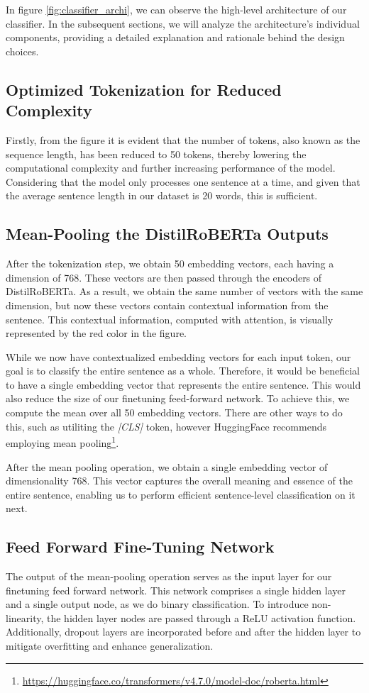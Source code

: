 \documentclass[a4paper,10pt]{report}
\begin{document}
In figure \ref{fig:classifier_archi}, we can observe the high-level architecture of our classifier. In the subsequent sections, we will analyze the architecture's individual components, providing a detailed explanation and rationale behind the design choices.

\subsection{Optimized Tokenization for Reduced Complexity}
Firstly, from the figure it is evident that the number of tokens, also known as the sequence length, has been reduced to 50 tokens, thereby lowering the computational complexity and further increasing performance of the model. Considering that the model only processes one sentence at a time, and given that the average sentence length in our dataset is 20 words, this is sufficient.

\subsection{Mean-Pooling the DistilRoBERTa Outputs}
After the tokenization step, we obtain 50 embedding vectors, each having a dimension of 768. These vectors are then passed through the encoders of DistilRoBERTa. As a result, we obtain the same number of vectors with the same dimension, but now these vectors contain contextual information from the sentence. This contextual information, computed with attention, is visually represented by the red color in the figure.

While we now have contextualized embedding vectors for each input token, our goal is to classify the entire sentence as a whole. Therefore, it would be beneficial to have a single embedding vector that represents the entire sentence. This would also reduce the size of our finetuning feed-forward network. To achieve this, we compute the mean over all 50 embedding vectors. There are other ways to do this, such as utiliting the \textit{[CLS]} token, however HuggingFace recommends employing mean pooling\footnote{\url{https://huggingface.co/transformers/v4.7.0/model-doc/roberta.html}}.

After the mean pooling operation, we obtain a single embedding vector of dimensionality 768. This vector captures the overall meaning and essence of the entire sentence, enabling us to perform efficient sentence-level classification on it next.

\subsection{Feed Forward Fine-Tuning Network}
The output of the mean-pooling operation serves as the input layer for our finetuning feed forward network. This network comprises a single hidden layer and a single output node, as we do binary classification. To introduce non-linearity, the hidden layer nodes are passed through a ReLU activation function. Additionally, dropout layers are incorporated before and after the hidden layer to mitigate overfitting and enhance generalization.
\end{document}
